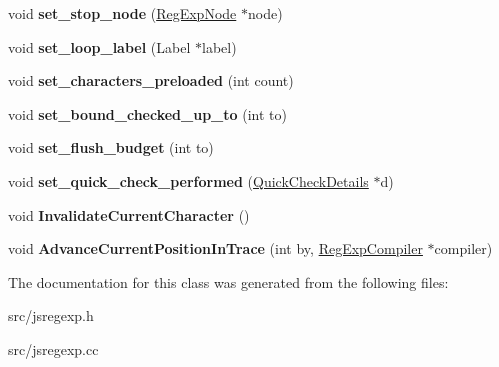\begin{DoxyCompactItemize}
\item 
\hypertarget{classv8_1_1internal_1_1_trace_a15c4f73f8c67ffe1cc89022e77f0f08d}{}void {\bfseries set\+\_\+stop\+\_\+node} (\hyperlink{classv8_1_1internal_1_1_reg_exp_node}{Reg\+Exp\+Node} $\ast$node)\label{classv8_1_1internal_1_1_trace_a15c4f73f8c67ffe1cc89022e77f0f08d}

\item 
\hypertarget{classv8_1_1internal_1_1_trace_af1892d71317fec9d1572d586eaaa650a}{}void {\bfseries set\+\_\+loop\+\_\+label} (Label $\ast$label)\label{classv8_1_1internal_1_1_trace_af1892d71317fec9d1572d586eaaa650a}

\item 
\hypertarget{classv8_1_1internal_1_1_trace_a814b56c3489e65d99c19444307d92b4b}{}void {\bfseries set\+\_\+characters\+\_\+preloaded} (int count)\label{classv8_1_1internal_1_1_trace_a814b56c3489e65d99c19444307d92b4b}

\item 
\hypertarget{classv8_1_1internal_1_1_trace_acc47ada5b60091d4cffa56843d1caa19}{}void {\bfseries set\+\_\+bound\+\_\+checked\+\_\+up\+\_\+to} (int to)\label{classv8_1_1internal_1_1_trace_acc47ada5b60091d4cffa56843d1caa19}

\item 
\hypertarget{classv8_1_1internal_1_1_trace_af3db12d8d1de2cab0a28f4138e6e6c9d}{}void {\bfseries set\+\_\+flush\+\_\+budget} (int to)\label{classv8_1_1internal_1_1_trace_af3db12d8d1de2cab0a28f4138e6e6c9d}

\item 
\hypertarget{classv8_1_1internal_1_1_trace_a9eb035553c6ae5b4998acdb6544b7976}{}void {\bfseries set\+\_\+quick\+\_\+check\+\_\+performed} (\hyperlink{classv8_1_1internal_1_1_quick_check_details}{Quick\+Check\+Details} $\ast$d)\label{classv8_1_1internal_1_1_trace_a9eb035553c6ae5b4998acdb6544b7976}

\item 
\hypertarget{classv8_1_1internal_1_1_trace_afb21dd6aad6cd15722fdadf6fd58554a}{}void {\bfseries Invalidate\+Current\+Character} ()\label{classv8_1_1internal_1_1_trace_afb21dd6aad6cd15722fdadf6fd58554a}

\item 
\hypertarget{classv8_1_1internal_1_1_trace_a7e078348b42259aaaa38bc2a2f90d2ab}{}void {\bfseries Advance\+Current\+Position\+In\+Trace} (int by, \hyperlink{classv8_1_1internal_1_1_reg_exp_compiler}{Reg\+Exp\+Compiler} $\ast$compiler)\label{classv8_1_1internal_1_1_trace_a7e078348b42259aaaa38bc2a2f90d2ab}

\end{DoxyCompactItemize}


The documentation for this class was generated from the following files\+:\begin{DoxyCompactItemize}
\item 
src/jsregexp.\+h\item 
src/jsregexp.\+cc\end{DoxyCompactItemize}

